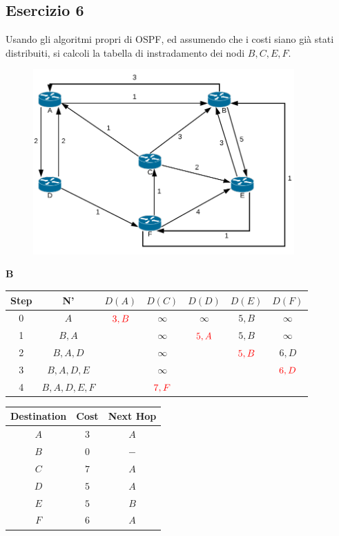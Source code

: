 \documentclass[10pt]{article}
\begin{document}
	\newpage
	
	\subsection{Esercizio 6}
	Usando gli algoritmi propri di OSPF, ed assumendo che i costi siano già stati distribuiti, si calcoli la tabella di instradamento dei nodi ${B,C,E,F}$.
	\begin{figure}[h]
	\centering
	\includegraphics[width=10cm]{es6}
	\end{figure}
	\begin{center}
	 	\textbf{B}
 		\begin{tabular}{||c c c c c c c||} 
 			\hline
 			Step & N' & $D(A)$ & $D(C)$ & $D(D)$ & $D(E)$ & $D(F)$ \\[0.5ex] 
 			\hline\hline
 			0 & $A$ & $\color{red} 3,B$ & $\infty$ & $\infty$ & $5,B$ & $\infty$ \\
 			\hline
 			1 & $B,A$ & & $\infty$ & $\color{red} 5,A$ & $5,B$ & $\infty$ \\
 			\hline
 			2 & $B,A,D$ & & $\infty$ & & $\color{red} 5,B$ & $6,D$ \\
 			\hline
 			3 & $B,A,D,E$ & & $\infty$ & & & $\color{red} 6,D$ \\
 			\hline
 			4 & $B,A,D,E,F$ & & $\color{red} 7,F$ & & & \\
			\hline
		\end{tabular}
		\quad
		\begin{tabular}{||c || c || c||}
			\hline
 			Destination & Cost & Next Hop\\[0.5ex] 
 			\hline\hline
			$A$ & $3$ & $A$\\
			$B$ & $0$ & $-$\\
 			$C$ & $7$ & $A$\\
			$D$ & $5$ & $A$\\
			$E$ & $5$ & $B$\\
			$F$ & $6$ & $A$\\[0.5ex]
			\hline
		\end{tabular}
	\end{center}
	
\end{document}
